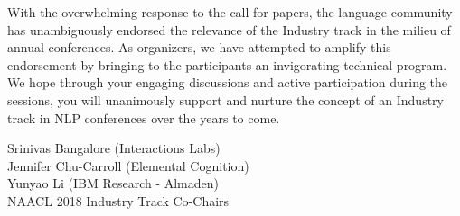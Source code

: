 With the overwhelming response to the call for papers, the language community has unambiguously endorsed the relevance of the Industry track in the milieu of annual conferences.  As organizers, we have attempted to amplify this endorsement by bringing to the participants an invigorating technical program. We hope through your engaging discussions and active participation during the sessions, you will unanimously support and nurture the concept of an Industry track in NLP conferences over the years to come.



\vskip 0.5in
\noindent Srinivas Bangalore (Interactions Labs) \\
Jennifer Chu-Carroll (Elemental Cognition) \\
Yunyao Li (IBM Research - Almaden) \\
NAACL 2018 Industry Track Co-Chairs



